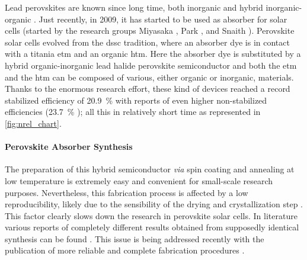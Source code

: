 	Lead perovskites are known since long time, both inorganic \cite{Moller1958} and hybrid inorganic\hyp{}organic \cite{Weber1978}.
	Just recently, in 2009, it has started to be used as absorber for solar cells (started by the research groups Miyasaka \cite{Kojima2009}, Park \cite{Im2011a,Kim2012b}, and Snaith \cite{Lee2012}).
	Perovskite solar cells evolved from the \gls{dssc} tradition, where an absorber dye is in contact with a titania \gls{etm} and an organic \gls{htm}.
	Here the absorber dye is substituted by a hybrid organic-inorganic lead halide perovskite semiconductor and both the \gls{etm} and the \gls{htm} can be composed of various, either organic or inorganic, materials.
	Thanks to the enormous research effort, these kind of devices reached a record stabilized efficiency of 20.9~\% \cite{Green2019} with reports of even higher non-stabilized efficiencies (23.7~\% \cite{Green2019,Jiang2017}); all this in relatively short time as represented in \cref{fig:nrel_chart}.



\begin{figure}
\end{figure}


	\paragraph{Perovskite Absorber Synthesis}
	The preparation of this hybrid semiconductor \textsl{via} spin coating and annealing at low temperature is extremely easy and convenient for small-scale research purposes.
	Nevertheless, this fabrication process is affected by a low reproducibility, likely due to the sensibility of the drying and crystallization step \cite{Pockett2015}.
	This factor clearly slows down the research in perovskite solar cells.
	In literature various reports of completely different results obtained from supposedly identical synthesis can be found \cite{Pockett2015,Gottesman2014}.
	This issue is being addressed recently with the publication of more reliable and complete fabrication procedures \cite{Saliba2018}.

